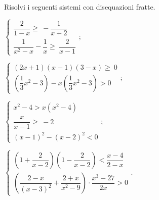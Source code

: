 \begin{esercizio}[\Ast]
\label{ese:20.74}
Risolvi i seguenti sistemi con disequazioni fratte.
\begin{multicols}{2}
\begin{enumeratea}{\longarray
 \item $\left\{\begin{array}{l}
		\dfrac{2}{1-x}\ge~-\dfrac{1}{x+2}\\
		\dfrac{1}{x^{2}-x}-\dfrac{1}{x}\ge~\dfrac{2}{x-1}
	\end{array}\right.;$
\item $\left\{\begin{array}{l}
        (2x+1)(x-1)(3-x)\ge~0\\
        \left(\dfrac{1}{3}x^{2}-3\right)-x\left(\dfrac{1}{3}x^{2}-3\right)>0
       \end{array}\right.;$
\item $\left\{\begin{array}{l}
	   x^{2}-4>x\left(x^{2}-4\right)\\
	   \dfrac{x}{x-1}\ge~-2\\
	   (x-1)^{2}-(x-2)^{2}<0
	   \end{array}\right.;$
\item $\left\{\begin{array}{l}
	   \left(1+\dfrac{2}{x-2}\right)\left(1-\dfrac{2}{x-2}\right)<\dfrac{x-4}{2-x}\\
	   \left(\dfrac{2-x}{(x-3)^{2}}+\dfrac{2+x}{x^{2}-9}\right)\cdot{\dfrac{x^{3}-27}{2x}}>0
	   \end{array}\right..$}
\end{enumeratea}
\end{multicols}

\end{esercizio}

